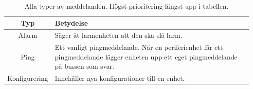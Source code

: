 \begin{table}[h]
    \caption{Alla typer av meddelanden. Högst prioritering längst upp i tabellen.}
    \begin{center}
     \begin{tabular}{ |c p{8cm}| }  
     \hline
     Typ & Betydelse  \\ [0.5ex] 
     \hline\hline
     Alarm & Säger åt larmenheten att den ska slå larm. \\ 
     \hline
     Ping & Ett vanligt pingmeddelande. När en periferienhet får ett pingmeddelande lägger enheten upp ett eget pingmeddelande på bussen som svar. \\
     \hline
     Konfigurering & Innehåller nya konfigurationer till en enhet. \\
     \hline
    \end{tabular}
    \end{center}
    \label{tab:msg_types}
\end{table}


